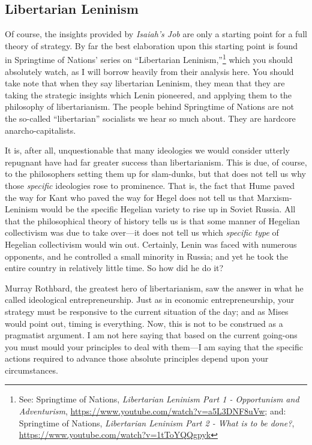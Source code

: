 \documentclass[11pt]{article}
\begin{document}
\subsection{Libertarian Leninism}
\label{sec:org1f3ab63}
Of course, the insights provided by \emph{Isaiah's Job} are only a starting point for a full theory of strategy. By far the best elaboration upon this starting point is found in Springtime of Nations' series on ``Libertarian Leninism,''\footnote{See: Springtime of Nations, \emph{Libertarian Leninism Part 1 - Opportunism and Adventurism}, \url{https://www.youtube.com/watch?v=a5L3DNF8uVw}; and: Springtime of Nations, \emph{Libertarian Leninism Part 2 - What is to be done?}, \url{https://www.youtube.com/watch?v=1tToYQQgpyk}} which you should absolutely watch, as I will borrow heavily from their analysis here. You should take note that when they say libertarian Leninism, they mean that they are taking the strategic insights which Lenin pioneered, and applying them to the philosophy of libertarianism. The people behind Springtime of Nations are not the so-called ``libertarian'' socialists we hear so much about. They are hardcore anarcho-capitalists.

It is, after all, unquestionable that many ideologies we would consider utterly repugnant have had far greater success than libertarianism. This is due, of course, to the philosophers setting them up for slam-dunks, but that does not tell us why those \emph{specific} ideologies rose to prominence. That is, the fact that Hume paved the way for Kant who paved the way for Hegel does not tell us that Marxism-Leninism would be the specific Hegelian variety to rise up in Soviet Russia. All that the philosophical theory of history tells us is that some manner of Hegelian collectivism was due to take over---it does not tell us which \emph{specific type} of Hegelian collectivism would win out. Certainly, Lenin was faced with numerous opponents, and he controlled a small minority in Russia; and yet he took the entire country in relatively little time. So how did he do it?

Murray Rothbard, the greatest hero of libertarianism, saw the answer in what he called ideological entrepreneurship. Just as in economic entrepreneurship, your strategy must be responsive to the current situation of the day; and as Mises would point out, timing is everything. Now, this is not to be construed as a pragmatist argument. I am not here saying that based on the current going-ons you must mould your principles to deal with them---I am saying that the specific actions required to advance those absolute principles depend upon your circumstances.
\end{document}
